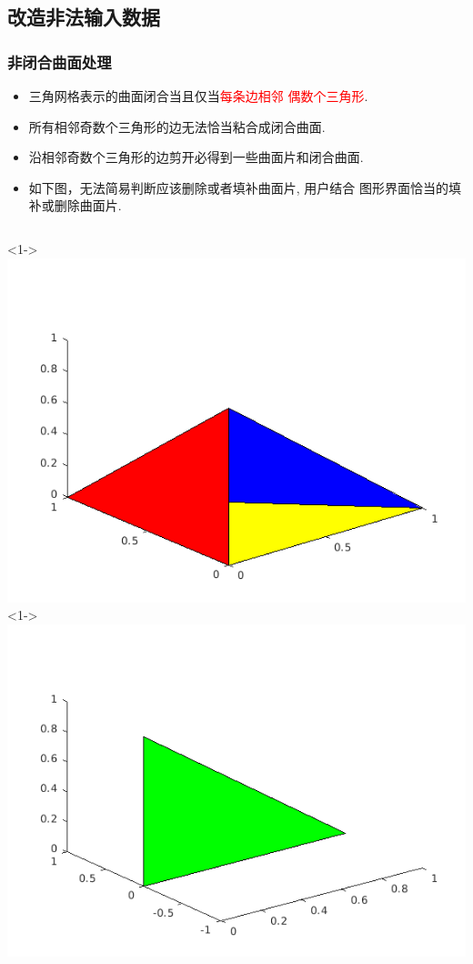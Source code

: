 \documentclass[UTF8]{ctexbeamer}	%
\theoremstyle{plain}
\theoremstyle{definition}
\theoremstyle{remark}
\numberwithin{equation}{section}
\begin{document}
\subsection{改造非法输入数据}
\begin{frame}
    \frametitle{非闭合曲面处理}
    \begin{itemize}
        \item 三角网格表示的曲面闭合当且仅当\textcolor{red}{每条边相邻
        偶数个三角形}.

        \item 所有相邻奇数个三角形的边无法恰当粘合成闭合曲面.
        
        \item 沿相邻奇数个三角形的边剪开必得到一些曲面片和闭合曲面.
        
        \item 如下图，无法简易判断应该删除或者填补曲面片, 用户结合
        图形界面恰当的填补或删除曲面片.
        
    \end{itemize}

    \begin{columns}
        <1->
        \centering
        \includegraphics[width = .8\textwidth]{fig/bound1.png}
        <1->
        \centering
        \includegraphics[width = .8\textwidth]{fig/bound2.png}
    \end{columns}
\end{frame}
\end{document}
